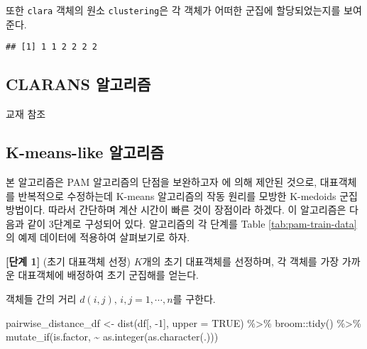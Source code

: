 \documentclass[
]{book}
\newenvironment{Shaded}{\begin{snugshade}}{\end{snugshade}}
\newcommand{\AttributeTok}[1]{\textcolor[rgb]{0.77,0.63,0.00}{#1}}
\newcommand{\ConstantTok}[1]{\textcolor[rgb]{0.00,0.00,0.00}{#1}}
\newcommand{\DecValTok}[1]{\textcolor[rgb]{0.00,0.00,0.81}{#1}}
\newcommand{\FunctionTok}[1]{\textcolor[rgb]{0.00,0.00,0.00}{#1}}
\newcommand{\NormalTok}[1]{#1}
\newcommand{\OtherTok}[1]{\textcolor[rgb]{0.56,0.35,0.01}{#1}}
\newcommand{\SpecialCharTok}[1]{\textcolor[rgb]{0.00,0.00,0.00}{#1}}
\begin{document}
또한 \texttt{clara} 객체의 원소 \texttt{clustering}은 각 객체가 어떠한 군집에 할당되었는지를 보여준다.

\begin{Shaded}
\end{Shaded}

\begin{verbatim}
## [1] 1 1 2 2 2 2
\end{verbatim}

\hypertarget{clarans}{%
\subsection{CLARANS 알고리즘}\label{clarans}}

교재 \citep{jun2012datamining} 참조

\hypertarget{kmeans-like}{%
\subsection{K-means-like 알고리즘}\label{kmeans-like}}

본 알고리즘은 PAM 알고리즘의 단점을 보완하고자 \citet{park2009simple} 에 의해 제안된 것으로, 대표객체를 반복적으로 수정하는데 K-means 알고리즘의 작동 원리를 모방한 K-medoids 군집 방법이다. 따라서 간단하며 계산 시간이 빠른 것이 장점이라 하겠다. 이 알고리즘은 다음과 같이 3단계로 구성되어 있다. 알고리즘의 각 단계를 Table \ref{tab:pam-train-data}의 예제 데이터에 적용하여 살펴보기로 하자.

\textbf{{[}단계 1{]}} (초기 대표객체 선정) \(K\)개의 초기 대표객체를 선정하며, 각 객체를 가장 가까운 대표객체에 배정하여 초기 군집해를 얻는다.

객체들 간의 거리 \(d(i, j), \, i, j = 1, \cdots, n\)를 구한다.

\begin{Shaded}
\begin{Highlighting}[]
\NormalTok{pairwise\_distance\_df }\OtherTok{\textless{}{-}} \FunctionTok{dist}\NormalTok{(df[, }\SpecialCharTok{{-}}\DecValTok{1}\NormalTok{], }\AttributeTok{upper =} \ConstantTok{TRUE}\NormalTok{) }\SpecialCharTok{\%\textgreater{}\%}
\NormalTok{  broom}\SpecialCharTok{::}\FunctionTok{tidy}\NormalTok{() }\SpecialCharTok{\%\textgreater{}\%}
  \FunctionTok{mutate\_if}\NormalTok{(is.factor, }\SpecialCharTok{\textasciitilde{}} \FunctionTok{as.integer}\NormalTok{(}\FunctionTok{as.character}\NormalTok{(.)))}
\end{Highlighting}
\end{Shaded}
\end{document}
